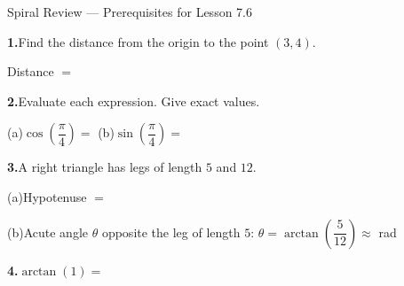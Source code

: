 \documentclass[10pt]{article}
\begin{document}
\namedateperiod

\vspace{0.10in}

\begin{notesbox}{Spiral Review --- Prerequisites for Lesson 7.6}

\textbf{1.}\quad Find the distance from the origin to the point $(3, 4)$.

\vspace{4pt}
Distance $= $ \blank{4cm}

\vspace{0.14in}
\textbf{2.}\quad Evaluate each expression. Give exact values.

\vspace{4pt}
(a)\quad $\cos\!\left(\dfrac{\pi}{4}\right) = $ \blank{2.5cm}
\hspace{1.5cm}
(b)\quad $\sin\!\left(\dfrac{\pi}{4}\right) = $ \blank{2.5cm}

\vspace{0.14in}
\textbf{3.}\quad A right triangle has legs of length $5$ and $12$.

\vspace{4pt}
(a)\quad Hypotenuse $= $ \blank{3cm}

\vspace{4pt}
(b)\quad Acute angle $\theta$ opposite the leg of length $5$:\quad
$\theta = \arctan\!\left(\dfrac{5}{12}\right) \approx$ \blank{2.5cm} rad

\vspace{0.14in}
\textbf{4.}\quad $\arctan(1) = $ \blank{2.5cm}

\end{notesbox}
\end{document}
